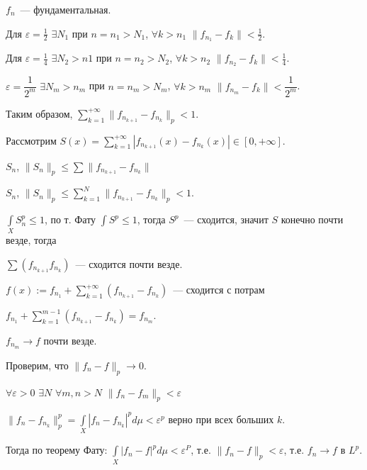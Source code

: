 \documentclass{article}
\begin{document}
            $f_n$~--- фундаментальная. 
            
            Для $\varepsilon = \frac{1}{2}$ $\exists N_1$ при $n = n_1 > N_1$, $\forall k > n_1$ $\| f_{n_1} - f_k \| < \frac{1}{2}$.
            
            Для $\varepsilon = \frac{1}{4}$ $\exists N_2 > n1$ при $n = n_2 > N_2$, $\forall k > n_2$ $\| f_{n_2} - f_k \| < \frac{1}{4}$.
            
            $\varepsilon = \dfrac{1}{2^m}$ $\exists N_m > n_m$ при $n = n_m > N_m$, $\forall k > n_m$ $\| f_{n_m} - f_k \| < \dfrac{1}{2^m}$.
            
            Таким образом, $\sum\limits_{k = 1}^{+\infty} \| f_{n_{k + 1}} - f_{n_k} \|_p < 1$.
            
            Рассмотрим $S(x) = \sum\limits_{k = 1}^{+\infty} | f_{n_{k + 1}}(x) - f_{n_k}(x) | \in [0, +\infty]$.
            
            $S_n$, $\| S_n \|_p \leqslant \sum \| f_{n_{k + 1}} - f_{n_k} \|$
            
            $S_n$, $\| S_n \|_p \leqslant \sum\limits^N_{k = 1} \| f_{n_{k + 1}} - f_{n_k} \|_p < 1$.
            
            $\int\limits_X S_n^p \leqslant 1$, по т. Фату $\int S^p \leqslant 1$, тогда $S^p$~--- сходится, значит $S$ конечно почти везде, тогда
            
            $\sum \left( f_{n_{k + 1}}  f_{n_k} \right)$~--- сходится почти везде.
            
            $f(x) := f_{n_1} + \sum\limits_{k = 1}^{+\infty} \left( f_{n_{k + 1}} - f_{n_k} \right)$~--- сходится с потрам
            
            $f_{n_1} + \sum\limits_{k = 1}^{m - 1} \left( f_{n_{k + 1}} - f_{n_k} \right) = f_{n_m}$.
            
            $f_{n_m} \rightarrow f$ почти везде.
            
            Проверим, что $\| f_n - f \|_p \rightarrow 0$.
            
            $\forall \varepsilon > 0$ $\exists N$ $\forall m, n > N$ $\| f_n - f_m \|_p < \varepsilon$
            
            $\| f_n - f_{n_k} \|^p_p = \int\limits_X |f_n - f_{n_k}|^p d\mu < \varepsilon^p$ верно при всех больших $k$.
            
            Тогда по теорему Фату: $\int\limits_X |f_n - f|^p d\mu < \varepsilon^P$, т.е. $\| f_n - f \|_p < \varepsilon$, т.е. $f_n \rightarrow f$ в $L^p$.
    
\end{document}
